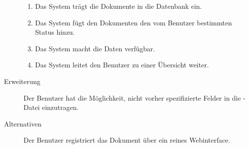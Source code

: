 \begin{description}
\begin{enumerate}
      \item Das System trägt die Dokumente in die Datenbank ein.
      \item Das System fügt den Dokumenten den vom Benutzer bestimmten Status hinzu.
      \item Das System macht die Daten verfügbar.
      \item Das System leitet den Benutzer zu einer Übersicht weiter.
    \end{enumerate}
  \item[Erweiterung]Der Benutzer hat die Möglichkeit, nicht vorher spezifizierte Felder in die \BibTeX -Datei einzutragen.
  \item[Alternativen]Der Benutzer registriert das Dokument über ein reines Webinterface.
\end{description}

